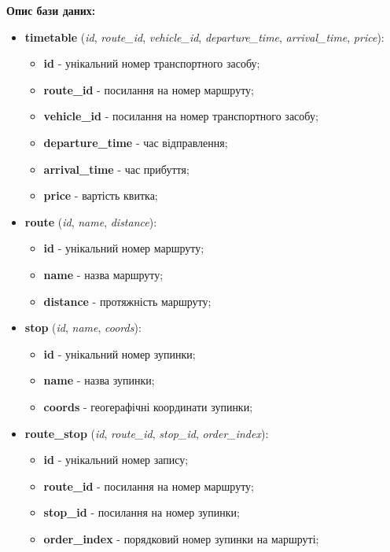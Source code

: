 \documentclass[14pt]{extreport}
\begin{document}
\begin{normalsize}
	\noindent\textbf{Опис бази даних:}
	\begin{itemize}
		\item \textbf{timetable} (\textit{id}, \textit{route\_id}, \textit{vehicle\_id}, \textit{departure\_time}, \textit{arrival\_time}, \textit{price}):
		\begin{itemize}
			\item \textbf{id} - унікальний номер транспортного засобу;
			\item \textbf{route\_id} - посилання на номер маршруту;
			\item \textbf{vehicle\_id} - посилання на номер транспортного засобу;
			\item \textbf{departure\_time} - час відправлення;
			\item \textbf{arrival\_time} - час прибуття;
			\item \textbf{price} - вартість квитка;
		\end{itemize}
		\item \textbf{route} (\textit{id}, \textit{name}, \textit{distance}):
		\begin{itemize}
			\item \textbf{id} - унікальний номер маршруту;
			\item \textbf{name} - назва маршруту;
			\item \textbf{distance} - протяжність маршруту;
		\end{itemize}
		\item \textbf{stop} (\textit{id}, \textit{name}, \textit{coords}):
		\begin{itemize}
			\item \textbf{id} - унікальний номер зупинки;
			\item \textbf{name} - назва зупинки;
			\item \textbf{coords} - геогерафічні координати зупинки;
		\end{itemize}
		\item \textbf{route\_stop} (\textit{id}, \textit{route\_id}, \textit{stop\_id}, \textit{order\_index}):
		\begin{itemize}
			\item \textbf{id} - унікальний номер запису;
			\item \textbf{route\_id} -  посилання на номер маршруту;
			\item \textbf{stop\_id} - посилання на номер зупинки;
			\item \textbf{order\_index} - порядковий номер зупинки на маршруті;
		\end{itemize}

\end{itemize}
\end{normalsize}
\end{document}
